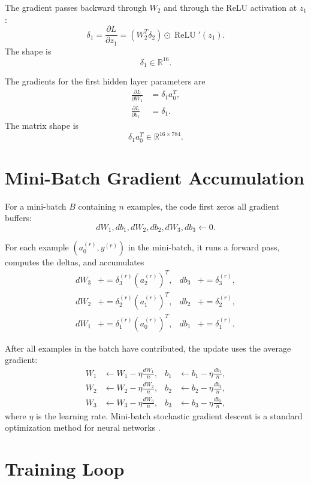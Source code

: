 \documentclass[11pt]{article}
\newcommand{\R}{\mathbb{R}}
\newcommand{\relu}{\operatorname{ReLU}}
\begin{document}
The gradient passes backward through $W_2$ and through the ReLU activation at
$z_1$:
\[
    \delta_1
    = \frac{\partial L}{\partial z_1}
    = (W_2^T \delta_2) \odot \relu'(z_1).
\]
The shape is
\[
    \delta_1 \in \R^{16}.
\]

The gradients for the first hidden layer parameters are
\[
\begin{aligned}
    \frac{\partial L}{\partial W_1} &= \delta_1 a_0^T, \\
    \frac{\partial L}{\partial b_1} &= \delta_1.
\end{aligned}
\]
The matrix shape is
\[
    \delta_1 a_0^T \in \R^{16 \times 784}.
\]

\section{Mini-Batch Gradient Accumulation}

For a mini-batch $B$ containing $n$ examples, the code first zeros all gradient
buffers:
\[
    dW_1, db_1, dW_2, db_2, dW_3, db_3 \leftarrow 0.
\]

For each example $(a_0^{(r)}, y^{(r)})$ in the mini-batch, it runs a forward pass,
computes the deltas, and accumulates
\[
\begin{aligned}
    dW_3 &\mathrel{+}= \delta_3^{(r)} (a_2^{(r)})^T,
    & db_3 &\mathrel{+}= \delta_3^{(r)}, \\
    dW_2 &\mathrel{+}= \delta_2^{(r)} (a_1^{(r)})^T,
    & db_2 &\mathrel{+}= \delta_2^{(r)}, \\
    dW_1 &\mathrel{+}= \delta_1^{(r)} (a_0^{(r)})^T,
    & db_1 &\mathrel{+}= \delta_1^{(r)}.
\end{aligned}
\]

After all examples in the batch have contributed, the update uses the average
gradient:
\[
\begin{aligned}
    W_1 &\leftarrow W_1 - \eta \frac{dW_1}{n},
    & b_1 &\leftarrow b_1 - \eta \frac{db_1}{n}, \\
    W_2 &\leftarrow W_2 - \eta \frac{dW_2}{n},
    & b_2 &\leftarrow b_2 - \eta \frac{db_2}{n}, \\
    W_3 &\leftarrow W_3 - \eta \frac{dW_3}{n},
    & b_3 &\leftarrow b_3 - \eta \frac{db_3}{n},
\end{aligned}
\]
where $\eta$ is the learning rate. Mini-batch stochastic gradient descent is a
standard optimization method for neural networks \cite{goodfellow2016deep}.

\section{Training Loop}
\end{document}
